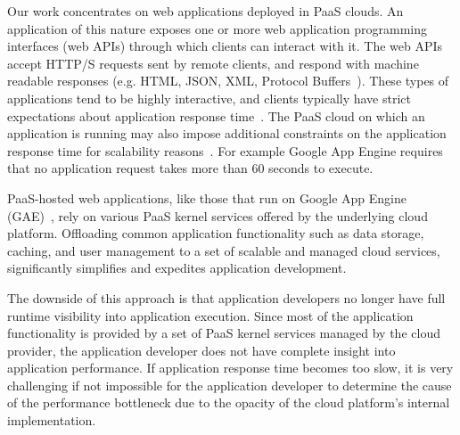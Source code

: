 

Our work concentrates on web
applications deployed in PaaS clouds. An application of this nature exposes
one or more web application programming interfaces (web APIs) through which
clients can interact with it. The web APIs accept HTTP/S requests sent by
remote clients, and respond with machine readable responses (e.g. HTML, JSON,
XML, Protocol Buffers~\cite{protobuff}). These types of applications tend to be highly
interactive, and clients typically have strict expectations about application
response time~\cite{latency-matters}. 
The PaaS cloud on
which an application is running may also impose additional constraints on the
application response time for scalability
reasons~\cite{azure-limits,gae-limits}.  For example Google App Engine
requires that no application request takes more than 60 seconds to execute.

PaaS-hosted web applications, like those that run on Google App Engine
(GAE)~\cite{gae},  
rely on various PaaS kernel services offered by the underlying
cloud platform. 
Offloading common application functionality such as data storage, caching,
and user management to a set of scalable and
managed cloud services, significantly simplifies and expedites
application development.

The downside of this approach is that application developers no longer have full runtime visibility
into application execution. Since most of the application functionality is provided by a set 
of PaaS kernel services managed by the cloud provider, the application
developer does not have complete insight into application performance. 
If application 
response time becomes too slow, it is very challenging if not impossible
for the application developer to determine
the cause of the performance bottleneck due to the opacity of the cloud
platform's internal implementation. 

